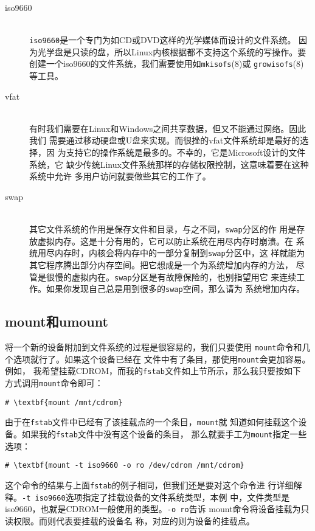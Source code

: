 \begin{description}
\item[iso9660] \hfill \\
  \texttt{iso9660}是一个专门为如CD或DVD这样的光学媒体而设计的文件系统。
  因为光学盘是只读的盘，所以Linux内核根据都不支持这个系统的写操作。要
  创建一个iso9660的文件系统，我们需要使用如\texttt{mkisofs}(8)或
  \texttt{growisofs}(8)等工具。
\item[vfat] \hfill \\
  有时我们需要在Linux和Windows之间共享数据，但又不能通过网络。因此我们
  需要通过移动硬盘或U盘来实现。而很挫的vfat文件系统却是最好的选择，因
  为支持它的操作系统是最多的。不幸的，它是Microsoft设计的文件系统，它
  缺少传统Linux文件系统那样的存储权限控制，这意味着要在这种系统中允许
  多用户访问就要做些其它的工作了。
\item[swap] \hfill \\
  其它文件系统的作用是保存文件和目录，与之不同，\texttt{swap}分区的作
  用是存放虚拟内存。这是十分有用的，它可以防止系统在用尽内存时崩溃。在
  系统用尽内存时，内核会将内存中的一部分复制到\texttt{swap}分区中，这
  样就能为其它程序腾出部分内存空间。把它想成是一个为系统增加内存的方法，
  尽管是很慢的虚拟内在。\texttt{swap}分区是有故障保险的，也别指望用它
  来连续工作。如果你发现自己总是用到很多的\texttt{swap}空间，那么请为
  系统增加内存。
\end{description}

\subsection{mount和umount}
\label{sec:filesystemStructure:mouting:mountAndUmount}
将一个新的设备附加到文件系统的过程是很容易的，我们只要使用
\texttt{mount}命令和几个选项就行了。如果这个设备已经在
文件中有了条目，那使用\texttt{mount}会更加容易。例如，
我希望挂载CDROM，而我的\texttt{fstab}文件如上节所示，那么我只要按如下
方式调用\texttt{mount}命令即可：
\begin{Verbatim}[frame=single,commandchars=\\\{\}]
# \textbf{mount /mnt/cdrom}
\end{Verbatim}
由于在\texttt{fstab}文件中已经有了该挂载点的一个条目，\texttt{mount}就
知道如何挂载这个设备。如果我的\texttt{fstab}文件中没有这个设备的条目，
那么就要手工为\texttt{mount}指定一些选项：
\begin{Verbatim}[frame=single,commandchars=\\\{\}]
# \textbf{mount -t iso9660 -o ro /dev/cdrom /mnt/cdrom}
\end{Verbatim}
这个命令的结果与上面\texttt{fstab}的例子相同，但我们还是要对这个命令进
行详细解释。\texttt{-t iso9660}选项指定了挂载设备的文件系统类型，本例
中，文件类型是iso9660，也就是CDROM一般使用的类型。\texttt{-o ro}告诉
mount命令将设备挂载为只读权限。而则代表要挂载的设备名
称，对应的则为设备的挂载点。

